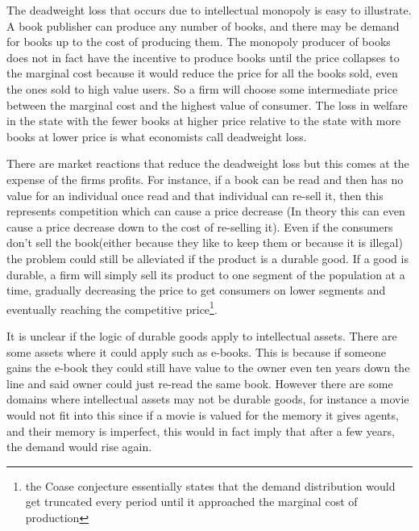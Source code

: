 The deadweight loss that occurs due to intellectual monopoly is easy to illustrate. A book publisher can produce any number of books, and there may be demand for books up to the cost of producing them. The monopoly producer of books does not in fact have the incentive to produce books until the price collapses to the marginal cost because it would reduce the price for all the books sold, even the ones sold to high value users. So a firm will choose some intermediate price between the marginal cost and the highest value of consumer. The loss in welfare in the state with the fewer books at higher price relative to the state with more books at lower price is what economists call deadweight loss. 

There are market reactions that reduce the deadweight loss but this comes at the expense of the firms profits. For instance, if a book can be read and then has no value for an individual once read and that individual can re-sell it, then this represents competition which can cause a price decrease (In theory this can even cause a price decrease down to the cost of re-selling it). Even if the consumers don't sell the book(either because they like to keep them or because it is illegal) the problem could still be alleviated if the product is a durable good. If a good is durable, a firm will simply sell its product to one segment of the population at a time, gradually decreasing the price to get consumers on lower segments and eventually reaching the competitive price\footnote{the Coase conjecture essentially states that the demand distribution would get truncated every period until it approached the marginal cost of production}. 

It is unclear if the logic of durable goods apply to intellectual assets. There are some assets where it could apply such as e-books. This is because if someone gains the e-book they could still have value to the owner even ten years down the line and said owner could just re-read the same book. However there are some domains where intellectual assets may not be durable goods, for instance a movie would not fit into this since if a movie is valued for the memory it gives agents, and their memory is imperfect, this would in fact imply that after a few years, the demand would rise again. 


